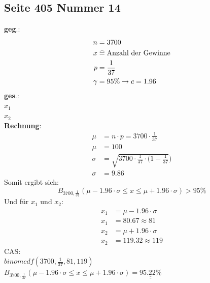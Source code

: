 \documentclass[a4paper,12pt]{article}
\newcommand\equalhat{\mathrel{\stackon[1.5pt]{=}{\stretchto{%
    \scalerel*[\widthof{=}]{\wedge}{\rule{1ex}{3ex}}}{0.5ex}}}}
\begin{document}
\subsection*{Seite 405 Nummer 14}
\textbf{geg}.:\\
\begin{equation*}
\begin{split}
n & = 3700\\
x & \equalhat \text{Anzahl der Gewinne}\\
p & = \frac{1}{37}\\
\gamma & = 95\% \rightarrow c = 1.96
\end{split}
\end{equation*}
\textbf{ges}.:\\
$x_{1}$\\
$x_{2}$\\
\textbf{Rechnung}:
\begin{equation*}
\begin{split}
\mu & = n \cdot p = 3700 \cdot \frac{1}{37}\\
\mu & = 100\\
\sigma & = \sqrt{3700 \cdot \frac{1}{37} \cdot (1 - \frac{1}{37}})\\
\sigma & = 9.86
\end{split}
\end{equation*}
Somit ergibt sich:
$$B_{3700, \frac{1}{37}}(\mu - 1.96 \cdot \sigma \leq x \leq \mu + 1.96 \cdot \sigma) > 95 \%$$
Und für $x_1$ und $x_2$:
\begin{equation*}
\begin{split}
x_{1} & = \mu - 1.96 \cdot \sigma\\
x_{1} & = 80.67 \approx 81\\
x_{2} & = \mu + 1.96 \cdot \sigma\\
x_{2} & = 119.32 \approx 119
\end{split}
\end{equation*}
CAS:\\
$binomcdf(3700, \frac{1}{37}, 81, 119)$\\
$B_{3700, \frac{1}{37}}(\mu - 1.96 \cdot \sigma \leq x \leq \mu + 1.96 \cdot \sigma) = \underline{\underline{95.22 \%}}$\\
\pagebreak
\end{document}
